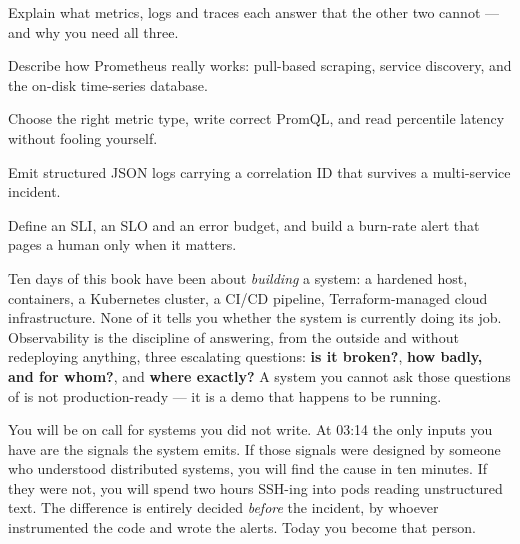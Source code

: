 
\begin{objectives}
\begin{wbitem}
  \item Explain what metrics, logs and traces each answer that the other two cannot --- and why you need all three.
  \item Describe how Prometheus really works: pull-based scraping, service discovery, and the on-disk time-series database.
  \item Choose the right metric type, write correct PromQL, and read percentile latency without fooling yourself.
  \item Emit structured JSON logs carrying a correlation ID that survives a multi-service incident.
  \item Define an SLI, an SLO and an error budget, and build a burn-rate alert that pages a human only when it matters.
\end{wbitem}
\end{objectives}


 Ten days of this book have been about \emph{building} a system: a hardened host, containers, a Kubernetes cluster, a CI/CD pipeline, Terraform-managed cloud infrastructure. None of it tells you whether the system is currently doing its job. Observability is the discipline of answering, from the outside and without redeploying anything, three escalating questions: \textbf{is it broken?}, \textbf{how badly, and for whom?}, and \textbf{where exactly?} A system you cannot ask those questions of is not production-ready --- it is a demo that happens to be running.

 You will be on call for systems you did not write. At 03:14 the only inputs you have are the signals the system emits. If those signals were designed by someone who understood distributed systems, you will find the cause in ten minutes. If they were not, you will spend two hours SSH-ing into pods reading unstructured text. The difference is entirely decided \emph{before} the incident, by whoever instrumented the code and wrote the alerts. Today you become that person.

